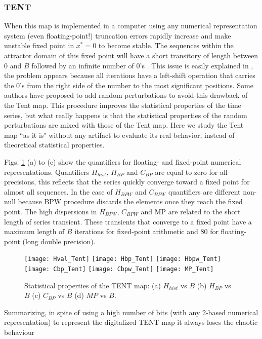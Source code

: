\subsubsection{TENT} \label{sssec:tent}

When this map is implemented in a computer using any numerical representation system (even floating-point!) truncation errors rapidly increase and make unstable fixed point in $x^*=0$ to become stable.
The sequences within the attractor domain of this fixed point will have a short transitory of length between $0$ and $B$ followed by an infinite number of $0$'s \cite{Jessa2002,Callegari}.
This issue is easily explained in \cite{Li2004}, the problem appears because all iterations have a left-shift operation that carries the $0$'s from the right side of the number to the most significant positions.
Some authors \cite{buscar} have proposed to add random perturbations to avoid this drawback of the Tent map.
This procedure improves the statistical properties of the time series, but what really happens is that the statistical properties of the random perturbations are mixed with those of the Tent map.
Here we study the Tent map ``as it is" without any artifact to evaluate its real behavior, instead of theoretical statistical properties. 

Figs. \ref{fig:TENT_QuantiB} (a) to (e) show the quantifiers for floating- and fixed-point numerical representations.
Quantifiers $H_{hist}$, $H_{BP}$ and $C_{BP}$ are equal to zero for all precisions, this reflects that the series quickly converge toward a fixed point for almost all sequences.
In the case of $H_{BPW}$ and $C_{BPW}$ quantifiers are different non-null because BPW procedure discards the elements once they reach the fixed point.
The high dispersions in $H_{BPW}$, $C_{BPW}$ and MP are related to the short length of series transient.
These transients that converge to a fixed point have a maximum length of $B$ iterations for fixed-point arithmetic and $80$ for floating-point (long double precision).

\begin{figure}
	\texttt{[image: Hval\_Tent]}
	\texttt{[image: Hbp\_Tent]}
	\texttt{[image: Hbpw\_Tent]}
	\texttt{[image: Cbp\_Tent]}
	\texttt{[image: Cbpw\_Tent]}
	\texttt{[image: MP\_Tent]}
	\caption{Statistical properties of the TENT map: (a) $H_{hist}$ vs $B$ (b) $H_{BP}$ vs $B$ (c) $C_{BP}$ vs $B$ (d) $MP$ vs $B$.}
	\label{fig:TENT_QuantiB}
\end{figure}

Summarizing, in spite of using a high number of bits (with any 2-based numerical representation) to represent the digitalized TENT map it always loses the chaotic behaviour
